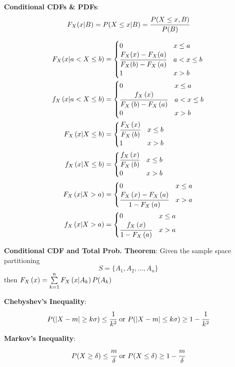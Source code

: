 \documentclass{article}
\newcommand{\sect}[1]{\noindent\textbf{#1}}
\begin{document}
\begin{small}
\begin{multicols*}{2}
	\sect{Conditional CDFs \& PDFs}:
		\[ F_X(x|B) = P(X\leq x|B) = \cfrac{P(X \leq x, B)}{P(B)} \]
		\begin{scriptsize}
		\[
		\begin{aligned}
		F_X(x|a < X \leq b) &= \begin{cases}
		0  &x\leq a\\
		\cfrac{F_X(x) - F_X(a)}{F_X(b) - \cdf[X][a]}  &a < x \leq b \\
		1  &x > b
		\end{cases} \\
		\pdf[X][x|a<X\leq b] &= \begin{cases}
		0 & x \leq a \\
		\cfrac{\pdf[X][x]}{\cdf[X][b]-\cdf[X][a]} & a < x \leq b\\
		0 & x > b
		\end{cases}\\
		\cdf[X][x|X \leq b] &= \begin{cases}
		\cfrac{\cdf[X][x]}{\cdf[X][b]} & x \leq b \\
		1 & x > b
		\end{cases} \\
		\pdf[X][x|X\leq b] &= \begin{cases}
		\cfrac{\pdf[X][x]}{\cdf[X][b]} & x \leq b \\
		0 & x > b
		\end{cases}\\
		\cdf[X][x|X > a] &= \begin{cases}
		0 & x \leq a \\
		\cfrac{\cdf[X][x] - \cdf[X][a]}{1-\cdf[X][a]} & x > a
		\end{cases}\\
		\pdf[X][x|X > a] &= \begin{cases}
		0 & x \leq a \\
		\cfrac{\pdf[X][x]}{1-\cdf[X][a]} & x > a
		\end{cases}
		\end{aligned} \]
		\end{scriptsize}
	
	\sect{Conditional CDF and Total Prob. Theorem}: Given the sample space partitioning
	\[ S = \{ A_1, A_2, \dots, A_n \} \]
	then $\cdf[X][x] = \sum\limits_{k=1}^n \cdf[X][x|A_k]P(A_k)$
	
	\sect{Chebyshev's Inequality}: 
		\[P(|X-m| \geq k\sigma) \leq \cfrac{1}{k^2}\text{ or } P(|X-m|\leq k\sigma) \geq 1-\cfrac{1}{k^2}\]
		
	\sect{Markov's Inequality}:
		\[P(X \geq \delta) \leq \cfrac{m}{\delta} \text{ or } P(X \leq \delta) \geq 1-\cfrac{m}{\delta} \]
		

\end{multicols*}
\end{small}
\end{document}
